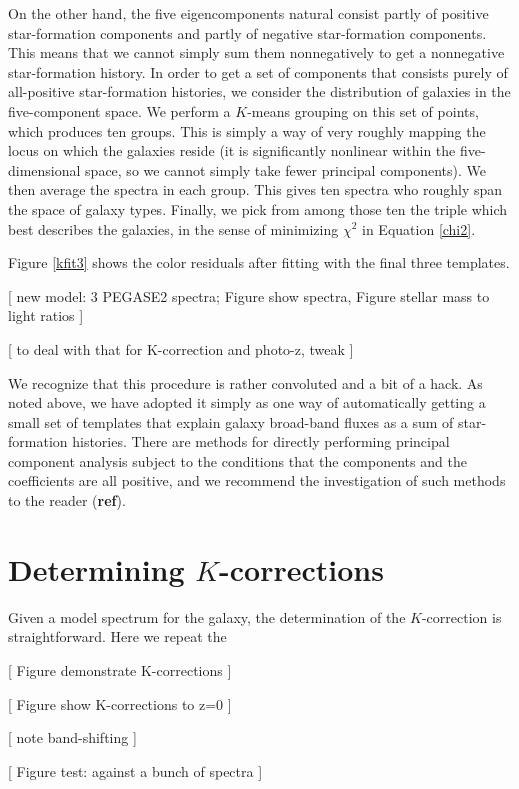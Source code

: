 \documentclass[10pt,preprint]{aastex}
\begin{document}
On the other hand, the five eigencomponents natural consist partly of
positive star-formation components and partly of negative
star-formation components. This means that we cannot simply sum them
nonnegatively to get a nonnegative star-formation history. In order to
get a set of components that consists purely of all-positive
star-formation histories, we consider the distribution of galaxies in
the five-component space. We perform a $K$-means grouping on this set
of points, which produces ten groups. This is simply a way of very
roughly mapping the locus on which the galaxies reside (it is
significantly nonlinear within the five-dimensional space, so we
cannot simply take fewer principal components). We then average the
spectra in each group. This gives ten spectra who roughly span the
space of galaxy types. Finally, we pick from among those ten the
triple which best describes the galaxies, in the sense of minimizing
$\chi^2$ in Equation \ref{chi2}. 

Figure \ref{kfit3} shows the color residuals after fitting with the
final three templates. 

[ new model: 3 PEGASE2 spectra; Figure show spectra, Figure stellar
  mass to light ratios ]

[ to deal with that for K-correction and photo-z, tweak ]
 
We recognize that this procedure is rather convoluted and a bit of a
hack. As noted above, we have adopted it simply as one way of
automatically getting a small set of templates that explain galaxy
broad-band fluxes as a sum of star-formation histories. There are
methods for directly performing principal component analysis subject
to the conditions that the components and the coefficients are all
positive, and we recommend the investigation of such methods to the
reader ({\bf ref}).

\section{Determining $K$-corrections} 
\label{kcorrect}

Given a model spectrum for the galaxy, the determination of the
$K$-correction is straightforward. Here we repeat the 

[ Figure demonstrate K-corrections ]

[ Figure show K-corrections to z=0 ]

[ note band-shifting ]

[ Figure test: against a bunch of spectra ]
\end{document}
